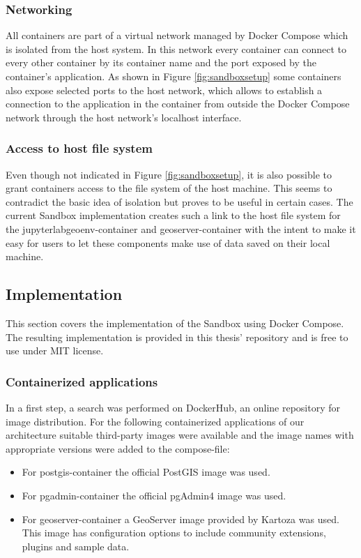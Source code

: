 \documentclass[11pt, a4paper, oneside, parskip=full-]{scrartcl}
\begin{document}
\subsubsection*{Networking}
All containers are part of a virtual network managed by Docker Compose which is
isolated from the host system. In this network every container can connect to
every other container by its container name and the port exposed by the
container's application. As shown in Figure \ref{fig:sandboxsetup} some
containers also expose selected ports to the host network, which allows to
establish a connection to the application in the container from outside the
Docker Compose network through the host network's localhost interface.

\subsubsection*{Access to host file system}
Even though not indicated in Figure \ref{fig:sandboxsetup}, it is also possible
to grant containers access to the file system of the host machine. This seems to
contradict the basic idea of isolation but proves to be useful in certain cases.
The current Sandbox implementation creates such a link to the host file system
for the jupyterlabgeoenv-container and geoserver-container with the intent to
make it easy for users to let these components make use of data saved on their
local machine.

\subsection{Implementation}

This section covers the implementation of the Sandbox using Docker Compose. The
resulting implementation is provided in this thesis'
repository\cite{osgissandbox} and is free to use under MIT license.

\subsubsection*{Containerized applications}
In a first step, a search was performed on DockerHub\cite{dockerhub}, an online
repository for image distribution. For the following containerized applications
of our architecture suitable third-party images were available and the image
names with appropriate versions were added to the compose-file:

\begin{itemize}
  \item For postgis-container the official PostGIS image was
  used\cite{postgis-container}.
  \item For pgadmin-container the official pgAdmin4 image was
  used\cite{pgadmin-container}.
  \item For geoserver-container a GeoServer image provided by Kartoza was
  used\cite{geoserver-container}. This image has configuration options to
  include community extensions, plugins and sample data.
\end{itemize}
\end{document}
